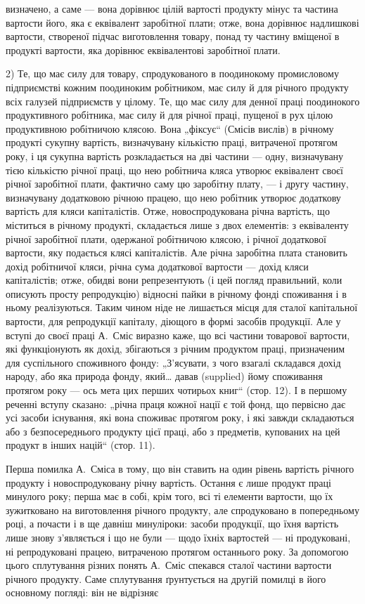 \parcont{}  %
визначено, а саме — вона дорівнює цілій вартості продукту мінус та частина вартости його, яка є
еквівалент заробітної плати; отже, вона дорівнює надлишкові вартости, створеної підчас виготовлення
товару, понад ту частину вміщеної в продукті вартости, яка дорівнює еквівалентові заробітної плати.

2) Те, що має силу для товару, спродукованого в поодинокому промисловому підприємстві кожним
поодиноким робітником, має силу й для річного продукту всіх галузей підприємств у цілому. Те, що має
силу для денної праці поодинокого продуктивного робітника, має силу й для річної праці, пущеної в
рух цілою продуктивною робітничою клясою. Вона „фіксує“ (Смісів вислів) в річному продукті сукупну
вартість, визначувану кількістю праці, витраченої протягом року, і ця сукупна вартість розкладається
на дві частини — одну, визначувану тією кількістю річної праці, що нею робітнича кляса утворює
еквівалент своєї річної заробітної плати, фактично саму цю заробітну плату, — і другу частину,
визначувану додатковою річною працею, що нею робітник утворює додаткову вартість для кляси
капіталістів. Отже, новоспродукована річна вартість, що міститься в річному продукті, складається
лише з двох елементів: з еквіваленту річної заробітної плати, одержаної робітничою клясою, і
річної додаткової вартости, яку подається клясі капіталістів. Але річна заробітна плата становить
дохід робітничої кляси, річна сума додаткової вартости — дохід кляси капіталістів; отже, обидві вони
репрезентують (і цей погляд правильний, коли описують просту репродукцію) відносні пайки в річному
фонді споживання і в ньому реалізуються. Таким чином ніде не лишається місця для сталої капітальної
вартости, для репродукції капіталу, діющого в формі засобів продукції. Але у вступі до своєї праці
А.~Сміс виразно каже, що всі частини товарової вартости, які функціонують як дохід, збігаються з
річним продуктом праці, призначеним для суспільного споживного фонду: „З’ясувати, з чого взагалі
складався дохід народу, або яка природа фонду, який\dots{} давав (supplied) йому споживання протягом
року — ось мета цих перших чотирьох книг“ (стор. 12). І в першому реченні вступу сказано: „річна
праця кожної нації є той фонд, що первісно дає усі засоби існування, які вона споживає протягом
року, і які завжди складаються або з безпосереднього продукту цієї праці, або з предметів, купованих
на цей продукт в інших націй“ (стор. 11).

Перша помилка А.~Сміса в тому, що він ставить на один рівень вартість річного продукту і
новоспродуковану річну вартість. Остання є лише продукт праці минулого року; перша має в собі, крім
того, всі ті елементи вартости, що їх зужитковано на виготовлення річного продукту, але спродуковано
в попередньому році, а почасти і в ще давніш минуліроки: засоби продукції, що їхня вартість лише
знову з’являється і що не були — щодо їхніх вартостей — ні продуковані, ні репродуковані працею,
витраченою протягом останнього року. За допомогою цього сплутування різних понять А.~Сміс
спекався сталої частини вартости річного продукту. Саме сплутування ґрунтується на другій помилці в
його основному погляді: він не відрізняє
\parbreak{}  %
